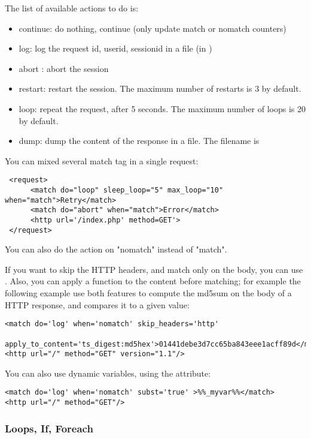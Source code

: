 \documentclass{TSUNG-en}
\begin{document}
The list of available actions to do is:
\begin{itemize}
\item continue: do nothing, continue (only update match or nomatch counters)
\item log: log the request id, userid, sessionid in a file (in )
\item abort : abort the session
\item restart: restart the session. The maximum number of
  restarts is 3 by default.
\item loop: repeat the request, after 5 seconds. The maximum number of
  loops is 20 by default.
\item dump: dump the content of the response in a file. The filename
  is 
\end{itemize}

You can mixed several match tag in a single request:
\begin{Verbatim}
 <request>
      <match do="loop" sleep_loop="5" max_loop="10" when="match">Retry</match>
      <match do="abort" when="match">Error</match>
      <http url='/index.php' method=GET'>
 </request>
\end{Verbatim}

You can also do the action on "nomatch" instead of "match".


If you want to skip the HTTP headers, and match only on the body, you
can use . Also, you can apply a
function to the content before matching; for example the following
example use both features to compute the md5sum on the body of a HTTP
response, and compares it to a given value:
\begin{Verbatim}
<match do='log' when='nomatch' skip_headers='http'
  apply_to_content='ts_digest:md5hex'>01441debe3d7cc65ba843eee1acff89d</match>
<http url="/" method="GET" version="1.1"/>
\end{Verbatim}

You can also use dynamic variables, using the  attribute:
\begin{Verbatim}
<match do='log' when='nomatch' subst='true' >%%_myvar%%</match>
<http url="/" method="GET"/>
\end{Verbatim}

\subsubsection{Loops, If, Foreach}
\end{document}
